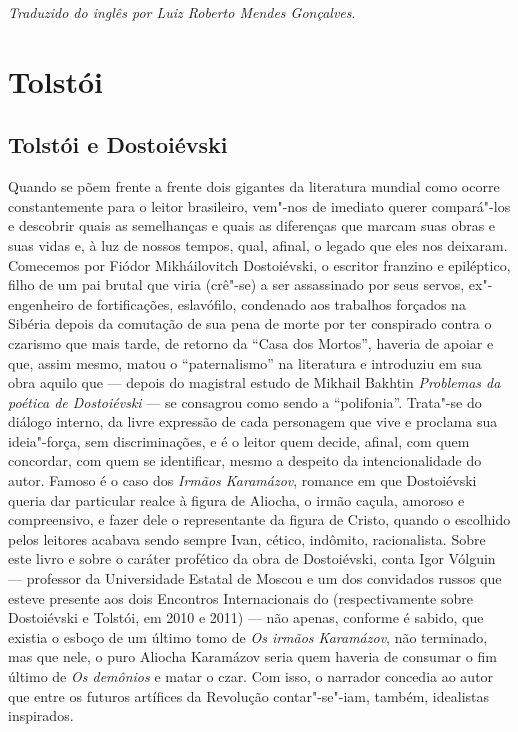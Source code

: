 \bigskip

\noindent
\emph{Traduzido do inglês por Luiz Roberto Mendes Gonçalves}.



\part{Tolstói}

\chapter{Tolstói e Dostoiévski}


Quando se põem frente a frente dois gigantes da literatura mundial como
ocorre constantemente para o leitor brasileiro, 
vem"-nos de imediato querer compará"-los e
descobrir quais as semelhanças e quais as diferenças que marcam suas
obras e suas vidas e, à luz de nossos tempos, qual, afinal, o legado que
eles nos deixaram. Comecemos por Fiódor Mikháilovitch Dostoiévski, o
escritor franzino e epiléptico, filho de um pai brutal que viria (crê"-se) a ser assassinado por seus servos, ex"-engenheiro de
fortificações, eslavófilo, condenado aos trabalhos forçados na Sibéria
depois da comutação de sua pena de morte por ter conspirado contra o
czarismo que mais tarde, de retorno da ``Casa dos Mortos'', haveria de
apoiar e que, assim mesmo, matou o ``paternalismo'' na literatura e
introduziu em sua obra aquilo que --- depois do magistral estudo de
Mikhail Bakhtin \emph{Problemas da poética de Dostoiévski} --- se consagrou como sendo a ``polifonia''.
Trata"-se do diálogo interno, da livre expressão de cada personagem que
vive e proclama sua ideia"-força, sem discriminações, e é o leitor quem
decide, afinal, com quem concordar, com quem se identificar, mesmo a
despeito da intencionalidade do autor. Famoso é o caso dos \emph{Irmãos
Karamázov}, romance em que Dostoiévski queria dar particular realce à
figura de Aliocha, o irmão caçula, amoroso e compreensivo, e fazer dele
o representante da figura de Cristo, quando o escolhido pelos leitores
acabava sendo sempre Ivan, cético, indômito, racionalista. Sobre este
livro e sobre o caráter profético da obra de Dostoiévski, conta Igor
Vólguin --- professor da Universidade Estatal de Moscou e um dos
convidados russos que esteve presente aos dois Encontros Internacionais do  (respectivamente sobre Dostoiévski e
Tolstói, em 2010 e 2011) --- não
apenas, conforme é sabido, que existia o esboço de um último tomo de
\emph{Os irmãos Karamázov}, não terminado, mas que nele, o puro
Aliocha Karamázov seria quem haveria de consumar o fim último de \emph{Os
demônios} e matar o czar. Com isso, o narrador concedia ao autor que
entre os futuros artífices da Revolução contar"-se"-iam, também,
idealistas inspirados.

